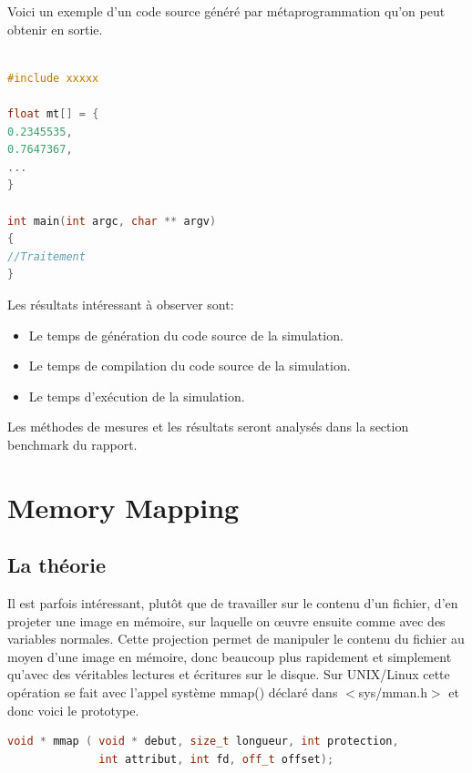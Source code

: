 \documentclass[a4paper,11pt]{report}
\begin{document}
\normalsize{
\noindent
Voici un exemple d'un code source généré par métaprogrammation qu'on peut obtenir en sortie.
}

\begin{lstlisting}[language=C++]

#include xxxxx

float mt[] = {
0.2345535,
0.7647367,
...
}

int main(int argc, char ** argv)
{
//Traitement
}
\end{lstlisting}

\vspace{0.5cm}
\normalsize{
\noindent
Les résultats intéressant à observer sont: \\
}

\begin{itemize}
    \item Le temps de génération du code source de la simulation.
    \item Le temps de compilation du code source de la simulation.
    \item Le temps d'exécution de la simulation. \\
\end{itemize}

\normalsize{
Les méthodes de mesures et les résultats seront analysés dans la section benchmark du rapport. \\
} 


\section {Memory Mapping}

\subsection{La théorie}
  
\normalsize{
Il est parfois intéressant, plutôt que de travailler sur le contenu d'un fichier, d'en projeter une image en mémoire, sur laquelle on œuvre ensuite comme avec des variables normales. Cette projection permet de manipuler le contenu du fichier au moyen d'une image en mémoire, donc beaucoup plus rapidement et simplement qu'avec des véritables lectures et écritures sur le disque. Sur UNIX/Linux cette opération se fait avec l'appel système mmap() déclaré dans $<$sys/mman.h$>$ et donc voici le prototype.
}

\begin{lstlisting}[language=C++]
void * mmap ( void * debut, size_t longueur, int protection,
              int attribut, int fd, off_t offset);
\end{lstlisting}
\end{document}
